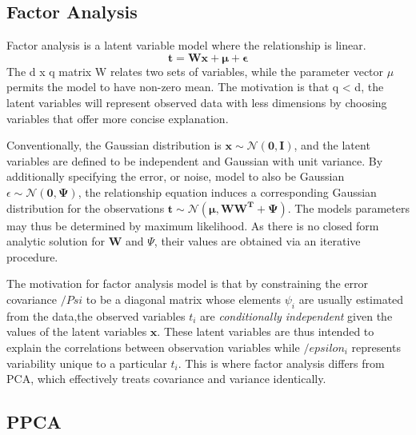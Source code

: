 \documentclass[ %
                    author={Dillon Keith Diep},
                supervisor={Dr. Carl Henrik Ek},
                    degree={MEng},
                     title={Assisted Content Generation for 3D Hair Geometry},
                  subtitle={[INCOMPLETE DRAFT, CONTAINS NOTES FROM RESEARCH]},
                      type={Research},
                      year={2014} ]{dissertation}
\begin{document}
\subsection{Factor Analysis}
Factor analysis is a latent variable model where the relationship is linear.
\begin{equation}
	\mathbf{t=Wx+\mu+\epsilon}
\end{equation}
The d x q matrix W relates two sets of variables, while the parameter vector $\mu$ permits the model to have non-zero mean. The motivation is that q < d, the latent variables will represent observed data with less dimensions by choosing variables that offer more concise explanation. 

Conventionally, the Gaussian distribution is $\mathbf{x}\sim\mathcal{N}(\mathbf{0,I})$, and the latent variables are defined to be independent and Gaussian with unit variance. By additionally specifying the error, or noise, model to also be Gaussian $\epsilon \sim\mathcal{N}(\mathbf{0, \Psi})$, the relationship equation induces a corresponding Gaussian distribution for the observations
$\mathbf{t\sim\mathcal{N}(\mu, \mathbf{WW}^T+\Psi)}$. The models parameters may thus be determined by maximum likelihood. As there is no closed form analytic solution for $\mathbf{W}$ and $\Psi$, their values are obtained via an iterative procedure.

The motivation for factor analysis model is that by constraining the error covariance $/Psi$ to be a diagonal matrix whose elements $\psi_i$ are usually estimated from the data,the observed variables $t_i$ are \textit{conditionally independent} given the values of the latent variables $\mathbf{x}$. These latent variables are thus intended to explain the correlations between observation variables while $/epsilon_i$ represents variability unique to a particular $t_i$. This is where factor analysis differs from PCA, which effectively treats covariance and variance identically.

\subsection{PPCA}
\end{document}
